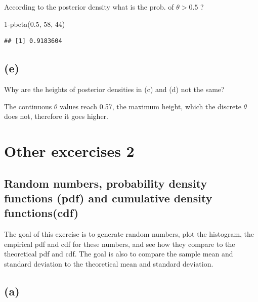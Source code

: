 \documentclass[
  10pt,
]{article}
\newenvironment{Shaded}{\begin{snugshade}}{\end{snugshade}}
\newcommand{\DecValTok}[1]{\textcolor[rgb]{0.00,0.00,0.81}{#1}}
\newcommand{\FloatTok}[1]{\textcolor[rgb]{0.00,0.00,0.81}{#1}}
\newcommand{\FunctionTok}[1]{\textcolor[rgb]{0.00,0.00,0.00}{#1}}
\newcommand{\NormalTok}[1]{#1}
\newcommand{\SpecialCharTok}[1]{\textcolor[rgb]{0.00,0.00,0.00}{#1}}
\begin{document}
According to the posterior density what is the prob. of \(\theta > 0.5\) ?

\begin{Shaded}
\begin{Highlighting}[]
\DecValTok{1}\SpecialCharTok{{-}}\FunctionTok{pbeta}\NormalTok{(}\FloatTok{0.5}\NormalTok{, }\DecValTok{58}\NormalTok{, }\DecValTok{44}\NormalTok{)}
\end{Highlighting}
\end{Shaded}

\begin{verbatim}
## [1] 0.9183604
\end{verbatim}

\hypertarget{e}{%
\subsection*{(e)}\label{e}}

Why are the heights of posterior densities in (c) and (d) not the same?

The continuous \(\theta\) values reach 0.57, the maximum height, which the discrete \(\theta\) does not, therefore it goes higher.

\hypertarget{other-excercises-2}{%
\section*{Other excercises 2}\label{other-excercises-2}}

\hypertarget{random-numbers-probability-density-functions-pdf-and-cumulative-density-functionscdf}{%
\subsection*{Random numbers, probability density functions (pdf) and cumulative density functions(cdf)}\label{random-numbers-probability-density-functions-pdf-and-cumulative-density-functionscdf}}

The goal of this exercise is to generate random numbers, plot the histogram, the empirical pdf and cdf for these numbers, and see how they compare to the theoretical pdf and cdf. The goal is also to compare the sample mean and standard deviation to the theoretical mean and standard deviation.

\hypertarget{a}{%
\subsection*{(a)}\label{a}}
\end{document}
